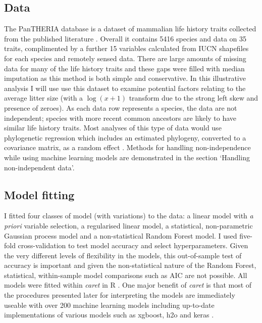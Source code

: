 \documentclass[10pt,]{article}
\begin{document}
\subsection{Data}\label{data}

The PanTHERIA database is a dataset of mammalian life history traits collected from the published literature \citep{jones2009pantheria}.
Overall it contains 5416 species and data on 35 traits, complimented by a further 15 variables calculated from IUCN shapefiles for each species and remotely sensed data.
There are large amounts of missing data for many of the life history traits and these gaps were filled with median imputation as this method is both simple and conservative.
In this illustrative analysis I will use use this dataset to examine potential factors relating to the average litter size (with a \(\log(x+1)\) transform due to the strong left skew and presence of zeroes).
As each data row represents a species, the data are not independent; species with more recent common ancestors are likely to have similar life history traits.
Most analyses of this type of data \citep{gay2014parasite, pellissier2012shifts, ferguson2014colony} would use phylogenetic regression which includes an estimated phylogeny, converted to a covariance matrix, as a random effect \citep{magnusson2017glmmtmb, caper}.
Methods for handling non-independence while using machine learning models are demonstrated in the section `Handling non-independent data'.

\subsection{Model fitting}\label{model-fitting}

I fitted four classes of model (with variations) to the data: a linear model with \emph{a priori} variable selection, a regularised linear model, a statistical, non-parametric Gaussian process model and a non-statistical Random Forest model.
I used five-fold cross-validation to test model accuracy and select hyperparameters.
Given the very different levels of flexibility in the models, this out-of-sample test of accuracy is important and given the non-statistical nature of the Random Forest, statistical, within-sample model comparisons such as AIC are not possible.
All models were fitted within \emph{caret} \citep{caret} in R \citep{R}.
One major benefit of \emph{caret} is that most of the procedures presented later for interpreting the models are immediately useable with over 200 machine learning models including up-to-date implementations of various models such as xgboost, h2o and keras \citep{xgboost, h2o, keras}.
\end{document}
